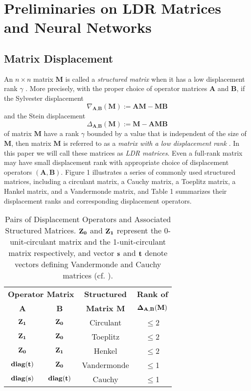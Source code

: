 \documentclass{article}
\begin{document}
\section{Preliminaries on LDR Matrices and Neural Networks}
\label{spre}
\subsection{Matrix Displacement}
An $n\times n$ matrix $\textbf{M}$ is called a \textit{structured matrix} when it has a low displacement rank $\gamma$ \cite{bini2012polynomial}. More precisely, with the proper choice of operator matrices $\textbf{A}$ and $\textbf{B}$, if the Sylvester displacement
\begin{equation}
\nabla_{\textbf{A},\textbf{B}}(\textbf{M}):= \textbf{AM} - \textbf{MB}
\end{equation}
and the Stein displacement
\begin{equation}
\Delta_{\textbf{A},\textbf{B}}(\textbf{M}):= \textbf{M}-\textbf{AMB}
\end{equation}
 of matrix $\textbf{M}$ have a rank $\gamma$ bounded by a value that is independent of the size of $\textbf{M}$, then matrix $\textbf{M}$ is referred to as a \textit{matrix with a low displacement rank} \cite{bini2012polynomial}. In this paper we will call these matrices as \textit{LDR matrices}. Even a full-rank matrix may have small displacement rank with appropriate choice of displacement operators $(\textbf{A}, \textbf{B})$. Figure 1 illustrates a series of commonly used structured matrices, including a circulant matrix, a Cauchy matrix, a Toeplitz matrix, a Hankel matrix, and a Vandermonde matrix, and Table 1 summarizes their displacement ranks and corresponding displacement operators.

\begin{table}
\label{table1}
\begin{center}
\begin{tabular}{|c|c|c|c|}
\hline
\multicolumn{2}{|c|}{\bf Operator Matrix} & {\bf %
Structured} & {\bf Rank of}\\
{\bf A} & {\bf B} & {\bf Matrix M} & ${\bf \Delta_{A, B}(M)}$\\\hline
${\bf Z_1}$ & ${\bf Z_0}$ & Circulant & $\le$2\\\hline
${\bf Z_1}$ & ${\bf Z_0}$ & Toeplitz & $\le$2\\\hline
${\bf Z_0}$ & ${\bf Z_1}$ & Henkel & $\le$2\\\hline
${\bf diag(t)}$& ${\bf Z_0}$ & Vandermonde & $\le$1\\\hline
${\bf diag(s)}$& ${\bf diag(t)}$ & Cauchy & $\le$1\\\hline
\end{tabular}
\end{center}
\caption{Pairs of Displacement Operators and Associated Structured Matrices. ${\bf Z_0}$ and ${\bf Z_1}$ represent the 0-unit-circulant matrix and the 1-unit-circulant matrix respectively, and vector ${\bf s}$ and ${\bf t}$ denote vectors defining Vandermonde and Cauchy matrices (cf. \cite{sindhwani2015structured}).}
\end{table}
\end{document}

